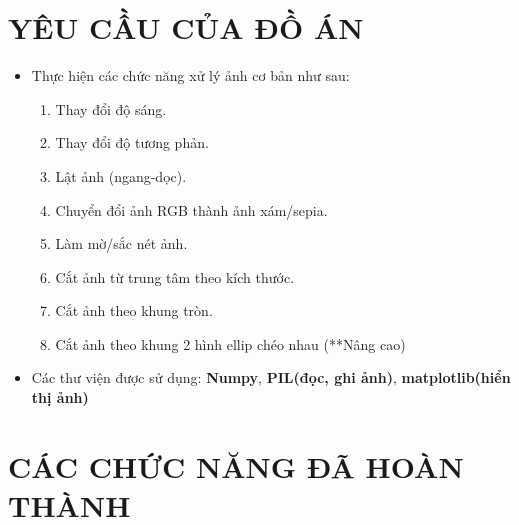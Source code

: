 \documentclass{report}
\begin{document}
\section{YÊU CẦU CỦA ĐỒ ÁN}
\begin{itemize}
    \item Thực hiện các chức năng xử lý ảnh cơ bản như sau: 
        \begin{enumerate}
            \item Thay đổi độ sáng.
            \item Thay đổi độ tương phản.
            \item Lật ảnh (ngang-dọc).
            \item Chuyển đổi ảnh RGB thành ảnh xám/sepia.
            \item Làm mờ/sắc nét ảnh.
            \item Cắt ảnh từ trung tâm theo kích thước.
            \item Cắt ảnh theo khung tròn.
            \item Cắt ảnh theo khung 2 hình ellip chéo nhau (**Nâng cao)
        \end{enumerate}

    \item Các thư viện được sử dụng: \textbf{Numpy}, \textbf{PIL(đọc, ghi ảnh)}, \textbf{matplotlib(hiển thị ảnh)}
\end{itemize}

\section{CÁC CHỨC NĂNG ĐÃ HOÀN THÀNH}
\end{document}
